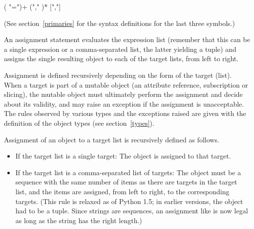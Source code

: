 \begin{productionlist}
             {( "=")+ }
             { ("," )* [","]}
             {}
\end{productionlist}

(See section~\ref{primaries} for the syntax definitions for the last
three symbols.)

An assignment statement evaluates the expression list (remember that
this can be a single expression or a comma-separated list, the latter
yielding a tuple) and assigns the single resulting object to each of
the target lists, from left to right.

Assignment is defined recursively depending on the form of the target
(list).  When a target is part of a mutable object (an attribute
reference, subscription or slicing), the mutable object must
ultimately perform the assignment and decide about its validity, and
may raise an exception if the assignment is unacceptable.  The rules
observed by various types and the exceptions raised are given with the
definition of the object types (see section~\ref{types}).

Assignment of an object to a target list is recursively defined as
follows.

\begin{itemize}
\item
If the target list is a single target: The object is assigned to that
target.

\item
If the target list is a comma-separated list of targets: The object
must be a sequence with the same number of items as there are
targets in the target list, and the items are assigned, from left to
right, to the corresponding targets.  (This rule is relaxed as of
Python 1.5; in earlier versions, the object had to be a tuple.  Since
strings are sequences, an assignment like  is
now legal as long as the string has the right length.)

\end{itemize}

